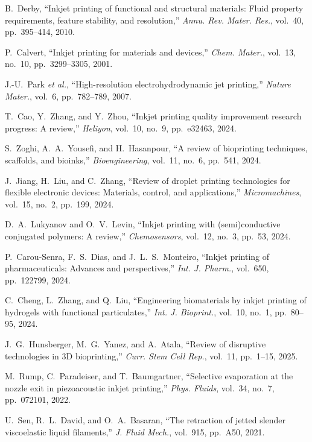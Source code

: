 \documentclass[conference]{IEEEtran}
\begin{document}
\begin{thebibliography}{99}

B.~Derby, ``Inkjet printing of functional and structural materials: Fluid property requirements, feature stability, and resolution,'' \emph{Annu. Rev. Mater. Res.}, vol.~40, pp.~395--414, 2010.

P.~Calvert, ``Inkjet printing for materials and devices,'' \emph{Chem. Mater.}, vol.~13, no.~10, pp.~3299--3305, 2001.

J.-U.~Park \emph{et al.}, ``High-resolution electrohydrodynamic jet printing,'' \emph{Nature Mater.}, vol.~6, pp.~782--789, 2007.

T.~Cao, Y.~Zhang, and Y.~Zhou, ``Inkjet printing quality improvement research progress: A review,'' \emph{Heliyon}, vol.~10, no.~9, pp.~e32463, 2024.

S.~Zoghi, A.~A.~Yousefi, and H.~Hasanpour, ``A review of bioprinting techniques, scaffolds, and bioinks,'' \emph{Bioengineering}, vol.~11, no.~6, pp.~541, 2024.

J.~Jiang, H.~Liu, and C.~Zhang, ``Review of droplet printing technologies for flexible electronic devices: Materials, control, and applications,'' \emph{Micromachines}, vol.~15, no.~2, pp.~199, 2024.

D.~A.~Lukyanov and O.~V.~Levin, ``Inkjet printing with (semi)conductive conjugated polymers: A review,'' \emph{Chemosensors}, vol.~12, no.~3, pp.~53, 2024.

P.~Carou-Senra, F.~S.~Dias, and J.~L.~S.~Monteiro, ``Inkjet printing of pharmaceuticals: Advances and perspectives,'' \emph{Int. J. Pharm.}, vol.~650, pp.~122799, 2024.

C.~Cheng, L.~Zhang, and Q.~Liu, ``Engineering biomaterials by inkjet printing of hydrogels with functional particulates,'' \emph{Int. J. Bioprint.}, vol.~10, no.~1, pp.~80--95, 2024.

J.~G.~Hunsberger, M.~G.~Yanez, and A.~Atala, ``Review of disruptive technologies in 3D bioprinting,'' \emph{Curr. Stem Cell Rep.}, vol.~11, pp.~1--15, 2025.

M.~Rump, C.~Paradeiser, and T.~Baumgartner, ``Selective evaporation at the nozzle exit in piezoacoustic inkjet printing,'' \emph{Phys. Fluids}, vol.~34, no.~7, pp.~072101, 2022.

U.~Sen, R.~L.~David, and O.~A.~Basaran, ``The retraction of jetted slender viscoelastic liquid filaments,'' \emph{J. Fluid Mech.}, vol.~915, pp.~A50, 2021.

\end{thebibliography}
\end{document}
